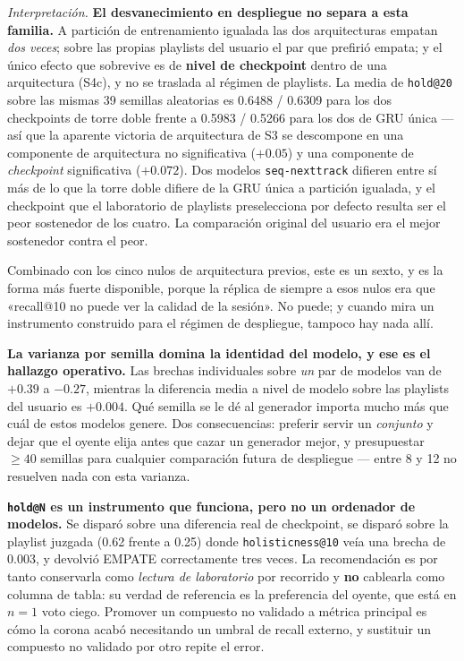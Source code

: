 \documentclass[11pt]{article}
\begin{document}
\emph{Interpretación.} \textbf{El desvanecimiento en despliegue no separa a esta
familia.} A partición de entrenamiento igualada las dos arquitecturas empatan
\emph{dos veces}; sobre las propias playlists del usuario el par que prefirió
empata; y el único efecto que sobrevive es de \textbf{nivel de checkpoint} dentro
de una arquitectura (S4c), y no se traslada al régimen de playlists. La media de
\texttt{hold@20} sobre las mismas \num{39} semillas aleatorias es \num{0.6488} /
\num{0.6309} para los dos checkpoints de torre doble frente a \num{0.5983} /
\num{0.5266} para los dos de GRU única --- así que la aparente victoria de
arquitectura de S3 se descompone en una componente de arquitectura no
significativa ($+\num{0.05}$) y una componente de \emph{checkpoint} significativa
($+\num{0.072}$). Dos modelos \texttt{seq-nexttrack} difieren entre sí más de lo
que la torre doble difiere de la GRU única a partición igualada, y el checkpoint
que el laboratorio de playlists preselecciona por defecto resulta ser el peor
sostenedor de los cuatro. La comparación original del usuario era el mejor
sostenedor contra el peor.

Combinado con los cinco nulos de arquitectura previos, este es un sexto, y es la
forma más fuerte disponible, porque la réplica de siempre a esos nulos era que
«recall@10 no puede ver la calidad de la sesión». No puede; y cuando mira un
instrumento construido para el régimen de despliegue, tampoco hay nada allí.

\textbf{La varianza por semilla domina la identidad del modelo, y ese es el
hallazgo operativo.} Las brechas individuales sobre \emph{un} par de modelos van de
$+\num{0.39}$ a $-\num{0.27}$, mientras la diferencia media a nivel de modelo sobre
las playlists del usuario es $+\num{0.004}$. Qué semilla se le dé al generador
importa mucho más que cuál de estos modelos genere. Dos consecuencias: preferir
servir un \emph{conjunto} y dejar que el oyente elija antes que cazar un generador
mejor, y presupuestar $\ge\num{40}$ semillas para cualquier comparación futura de
despliegue --- entre \num{8} y \num{12} no resuelven nada con esta varianza.

\textbf{\texttt{hold@N} es un instrumento que funciona, pero no un ordenador de
modelos.} Se disparó sobre una diferencia real de checkpoint, se disparó sobre la
playlist juzgada (\num{0.62} frente a \num{0.25}) donde
\texttt{holisticness@10} veía una brecha de \num{0.003}, y devolvió EMPATE
correctamente tres veces. La recomendación es por tanto conservarla como
\emph{lectura de laboratorio} por recorrido y \textbf{no} cablearla como columna de
tabla: su verdad de referencia es la preferencia del oyente, que está en $n=1$
voto ciego. Promover un compuesto no validado a métrica principal es cómo la corona
acabó necesitando un umbral de recall externo, y sustituir un compuesto no validado
por otro repite el error.
\end{document}

